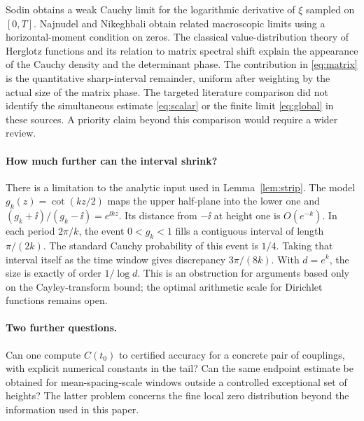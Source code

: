 \documentclass[11pt]{article}
\begin{document}
Sodin \cite[\S3.4.5, (55)]{sodin} obtains a weak Cauchy limit for the logarithmic derivative of $\xi$ sampled on $[0,T]$. Najnudel and Nikeghbali \cite{nn} obtain related macroscopic limits using a horizontal-moment condition on zeros. The classical value-distribution theory of Herglotz functions \cite{pearson,aw} and its relation to matrix spectral shift \cite{bmn} explain the appearance of the Cauchy density and the determinant phase. The contribution in \eqref{eq:matrix} is the quantitative sharp-interval remainder, uniform after weighting by the actual size of the matrix phase. The targeted literature comparison did not identify the simultaneous estimate \eqref{eq:scalar} or the finite limit \eqref{eq:global} in these sources. A priority claim beyond this comparison would require a wider review.

\paragraph{How much further can the interval shrink?}
There is a limitation to the analytic input used in Lemma~\ref{lem:strip}. The model $g_k(z)=\cot(kz/2)$ maps the upper half-plane into the lower one and
$(g_k+\ii)/(g_k-\ii)=e^{\ii kz}$. Its distance from $-\ii$ at height one is $O(e^{-k})$. In each period $2\pi/k$, the event $0<g_k<1$ fills a contiguous interval of length $\pi/(2k)$. The standard Cauchy probability of this event is $1/4$. Taking that interval itself as the time window gives discrepancy $3\pi/(8k)$. With $d=e^k$, the size is exactly of order $1/\log d$. This is an obstruction for arguments based only on the Cayley-transform bound; the optimal arithmetic scale for Dirichlet functions remains open.

\newpage
\paragraph{Two further questions.}
Can one compute $C(t_0)$ to certified accuracy for a concrete pair of couplings, with explicit numerical constants in the tail? Can the same endpoint estimate be obtained for mean-spacing-scale windows outside a controlled exceptional set of heights? The latter problem concerns the fine local zero distribution beyond the information used in this paper.
\end{document}
